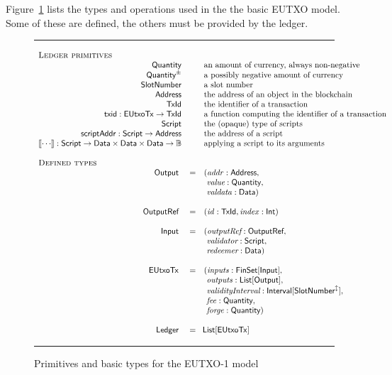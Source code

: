 \documentclass[a4paper]{article}
\renewcommand{\i}{\textit}  %
\newcommand{\s}{\textsf}  %
\newcommand{\msf}[1]{\ensuremath{\mathsf{#1}}}
\newcommand{\mi}[1]{\ensuremath{\mathit{#1}}}
\newcommand\rfskip{7pt}
\newenvironment{ruledfigure}[1]{\begin{figure}[#1]\hrule\vspace{\rfskip}}{\vspace{\rfskip}\hrule\end{figure}}
\newcommand{\List}[1]{\ensuremath{\s{List}[#1]}}
\newcommand{\FinSet}[1]{\ensuremath{\s{FinSet}[#1]}}
\newcommand{\Interval}[1]{\ensuremath{\s{Interval}[#1]}}
\newcommand{\extended}[1]{#1^\updownarrow}
\newcommand{\script}{\ensuremath{\s{Script}}}
\newcommand{\scriptAddr}{\msf{scriptAddr}}
\newcommand{\TxId}{\ensuremath{\s{TxId}}}
\newcommand{\txId}{\msf{txid}}
\newcommand{\txrefid}{\mi{id}}
\newcommand{\Address}{\ensuremath{\s{Address}}}
\newcommand{\idx}{\mi{index}}
\newcommand{\inputs}{\mi{inputs}}
\newcommand{\outputs}{\mi{outputs}}
\newcommand{\forge}{\mi{forge}}
\newcommand{\fee}{\mi{fee}}
\newcommand{\addr}{\mi{addr}}
\newcommand{\valdata}{\mi{valdata}}
\newcommand{\Data}{\ensuremath{\s{Data}}}
\newcommand{\slotnum}{\ensuremath{\s{SlotNumber}}}
\newcommand{\eutxotx}{\msf{EUtxoTx}}
\newcommand{\qty}{\ensuremath{\s{Quantity}}}
\newcommand{\qtypm}{\ensuremath{\s{Quantity}^{\pm}}}
\newcommand\B{\ensuremath{\mathbb{B}}}
\begin{document}
Figure~\ref{fig:eutxo-1-types} lists the types and operations used in the
the basic EUTXO model. Some of these are defined, the others must be provided by
the ledger.
\begin{ruledfigure}{H}
  \begin{displaymath}
  \begin{array}{rll}
    \multicolumn{3}{l}{\textsc{Ledger primitives}}\\
    \qty{} && \mbox{an amount of currency, always non-negative}\\
    \qtypm && \mbox{a possibly negative amount of currency}\\
    \slotnum && \mbox{a slot number}\\
    \Address && \mbox{the address of an object in the blockchain}\\
    \TxId && \mbox{the identifier of a transaction}\\
    \txId : \eutxotx \rightarrow \TxId && \mbox{a function computing the identifier of a transaction}\\
    \script && \mbox{the (opaque) type of scripts}\\
    \scriptAddr : \script \rightarrow \Address && \mbox{the address of a script}\\
    \llbracket \cdots \rrbracket : \script \rightarrow \Data \times \Data \times
    \Data \rightarrow \B && \mbox{applying a script to its arguments}\\
    \\
    \multicolumn{3}{l}{\textsc{Defined types}}\\
    \s{Output } &=&(\addr: \s{Address},\\
                & &\ \i{value}: \qty,\\
                & &\ \valdata: \Data)\\
    \\
    \s{OutputRef } &=&(\txrefid: \TxId, \idx: \s{Int})\\
    \\
    \s{Input } &=&(\i{outputRef}: \s{OutputRef},\\
               & &\ \i{validator}: \script,\\
               & &\ \i{redeemer}: \Data)\\
     \\
     \eutxotx\s{ } &=&(\inputs: \FinSet{\s{Input}},\\
                   & &\ \outputs: \List{\s{Output}},\\
                   & &\ \i{validityInterval}: \Interval{\extended{\slotnum}},\\
                   & &\ \fee: \qty,\\
                   & &\ \forge: \qty) \\
     \\
     \s{Ledger } &=&\!\List{\eutxotx}\\
  \end{array}
  \end{displaymath}
  \caption{Primitives and basic types for the EUTXO-1 model}
  \label{fig:eutxo-1-types}
\end{ruledfigure}
\end{document}
